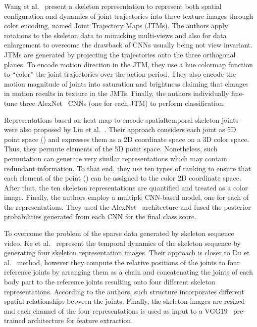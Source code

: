 \documentclass[10pt,conference]{IEEEtran}
\begin{document}
Wang et al.~\cite{Wang:2016, Wang:2018} present a skeleton representation to represent both spatial configuration and dynamics of joint trajectories into three texture images through color encoding, named Joint Trajectory Maps (JTMs). The authors apply rotations to the skeleton data to mimicking multi-views and also for data enlargement to overcome the drawback of CNNs usually being not view invariant. JTMs are generated by projecting the trajectories onto the three orthogonal planes. To encode motion direction in the JTM, they use a hue colormap function  to ``color'' the joint trajectories over the action period. They also encode the motion magnitude of joints into saturation and brightness claiming that changes in motion results in texture in the JMTs. Finally, the authors individually fine-tune three AlexNet~\cite{Krizhevsky:2012} CNNs (one for each JTM) to perform classification.

Representations based on heat map to encode spatialtemporal skeleton joints were also proposed by Liu et al.~\cite{Liu:2017}. Their approach considers each joint as 5D point space () and expresses them as a 2D coordinate space on a 3D color space. Thus, they permute elements of the 5D point space. Nonetheless, such permutation can generate very similar representations which may contain redundant information. To that end, they use ten types of ranking to ensure that each element of the point () can be assigned to the color 2D coordinate space. After that, the ten skeleton representations are quantified and treated as a color image. Finally, the authors employ a multiple CNN-based model, one for each of the representations. They used the AlexNet~\cite{Krizhevsky:2012} architecture and fused the posterior probabilities generated from each CNN for the final class score.

To overcome the problem of the sparse data generated by skeleton sequence video, Ke et al.~\cite{Ke:2017} represent the temporal dynamics of the skeleton sequence by generating four skeleton representation images. Their approach is closer to Du et al.~\cite{Du:2015} method, however they compute the relative positions of the joints to four reference joints by arranging them as a chain and concatenating the joints of each body part to the reference joints resulting onto four different skeleton representations. According to the authors, such structure incorporates different spatial relationships between the joints. Finally, the skeleton images are resized and each channel of the four representations is used as input to a VGG19~\cite{Simonyan:2015} pre-trained architecture for feature extraction.
\end{document}
